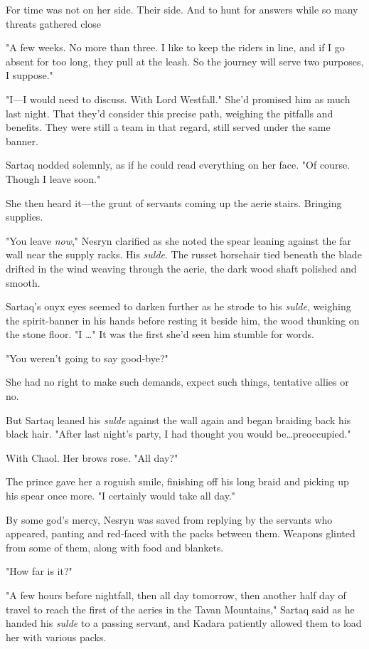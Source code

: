 For time was not on her side.
Their side.
And to hunt for answers while so many threats gathered close 

"A few weeks.
No more than three.
I like to keep the riders in line, and if I go absent for too long, they pull at the leash.
So the journey will serve two purposes, I suppose."

"I---I would need to discuss.
With Lord Westfall."
She'd promised him as much last night.
That they'd consider this precise path, weighing the pitfalls and benefits.
They were still a team in that regard, still served under the same banner.

Sartaq nodded solemnly, as if he could read everything on her face.
"Of course.
Though I leave soon."

She then heard it---the grunt of servants coming up the aerie stairs.
Bringing supplies.

"You leave \emph{now}," Nesryn clarified as she noted the spear leaning against the far wall near the supply racks.
His \emph{sulde}.
The russet horsehair tied beneath the blade drifted in the wind weaving through the aerie, the dark wood shaft polished and smooth.

Sartaq's onyx eyes seemed to darken further as he strode to his \emph{sulde}, weighing the spirit-banner in his hands before resting it beside him, the wood thunking on the stone floor.
"I \ldots" It was the first she'd seen him stumble for words.

"You weren't going to say good-bye?"

She had no right to make such demands, expect such things, tentative allies or no.

But Sartaq leaned his \emph{sulde} against the wall again and began braiding back his black hair.
"After last night's party, I had thought you would be\ldots preoccupied."

With Chaol.
Her brows rose.
"All day?"

The prince gave her a roguish smile, finishing off his long braid and picking up his spear once more.
"I certainly would take all day."

By some god's mercy, Nesryn was saved from replying by the servants who appeared, panting and red-faced with the packs between them.
Weapons glinted from some of them, along with food and blankets.

"How far is it?"

"A few hours before nightfall, then all day tomorrow, then another half day of travel to reach the first of the aeries in the Tavan Mountains," Sartaq said as he handed his \emph{sulde} to a passing servant, and Kadara patiently allowed them to load her with various packs.

